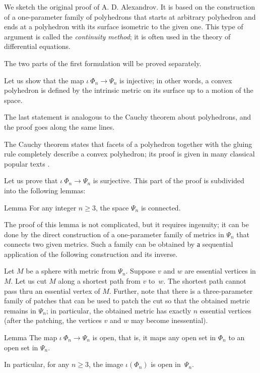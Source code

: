 We sketch the original proof of A. D. Alexandrov.
It is based on the  construction of a one-parameter family of polyhedrons that starts at arbitrary polyhedron
and ends at a polyhedron with its surface isometric to the given one.
This type of argument is called the \emph{continuity method}; it is often used in the theory of differential equations.

\medskip

The two parts of the first formulation will be proved separately.

 Let us show that the map $\iota\:\Phi_n\to\Psi_n$ is injective;
in other words, a convex polyhedron is defined by the intrinsic metric on its surface up to a motion of the space.

The last statement is analogous to the Cauchy theorem about polyhedrons,
and the proof goes along the same lines. 

The Cauchy theorem states that facets of a polyhedron together with the gluing rule completely describe a convex polyhedron;
its proof is given in many classical popular texts \cite{aigner-zigler,dolbilin,tabacnikov-fuks}.

\medskip

Let us prove that $\iota\:\Phi_n\to\Psi_n$ is surjective.
This part of the proof is subdivided into the following lemmas:

\begin{thm}{Lemma}
For any integer $n\ge 3$, the space $\Psi_n$ is connected.
\end{thm}

The proof of this lemma is not complicated, but it requires ingenuity;
it can be done by the direct construction of a one-parameter family of metrics in $\Psi_n$ that connects two given metrics.
Such a family can be obtained by а sequential application of the following construction and its inverse.

Let $M$ be a sphere with metric from $\Psi_n$.
Suppose $v$ and $w$ are essential vertices in $M$.
Let us cut $M$ along a shortest path from $v$ to~$w$.
The shortest path cannot pass thru an essential vertex of $M$.
Further, note that there is a three-parameter family of patches that can be used to patch the cut so that the obtained metric remains in $\Psi_n$;
in particular, the obtained metric has exactly $n$ essential vertices (after the patching, the vertices $v$ and $w$ may become inessential).


\begin{thm}{Lemma}
The map $\iota\:\Phi_n\to\Psi_n$ is open, 
that is, it maps any open set in $\Phi_n$ to an open set in $\Psi_n$.

In particular, for any $n\ge 3$, the image $\iota(\Phi_n)$ is open in~$\Psi_n$.
\end{thm}

